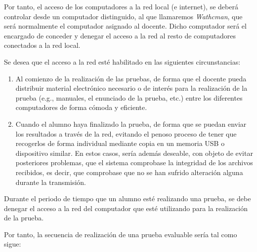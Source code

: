 
Por tanto, el acceso de los computadores a la red local (e internet), se deberá controlar desde un computador distinguido, al que llamaremos \emph{Wathcman},
que será normalmente el computador asignado al docente. Dicho computador será el encargado de conceder y denegar el acceso a la red al resto de computadores conectados a la red local.
\newline

Se desea que el acceso a la red esté habilitado en las siguientes circunstancias:
\begin{enumerate}
	\item Al comienzo de la realización de las pruebas, de forma que el docente pueda distribuir material electrónico necesario o de interés para la realización de la prueba (e.g., manuales, el enunciado de la prueba, etc.) entre los diferentes computadores de forma cómoda y eficiente.
	\item Cuando el alumno haya finalizado la prueba, de forma que se puedan enviar los resultados a través de la red, evitando el penoso proceso de tener que recogerlos de forma individual mediante copia en un memoria USB o dispositivo similar. En estos casos, sería además deseable, con objeto de evitar posteriores problemas, que el sistema comprobase la integridad de los archivos recibidos, es decir, que comprobase que no se han sufrido alteración alguna durante la transmisión.
\end{enumerate}

Durante el periodo de tiempo que un alumno esté realizando una prueba, se debe denegar el acceso a la red del computador que esté utilizando para la realización de la prueba.
\newline


Por tanto, la secuencia de realización de una prueba evaluable sería tal como sigue:

